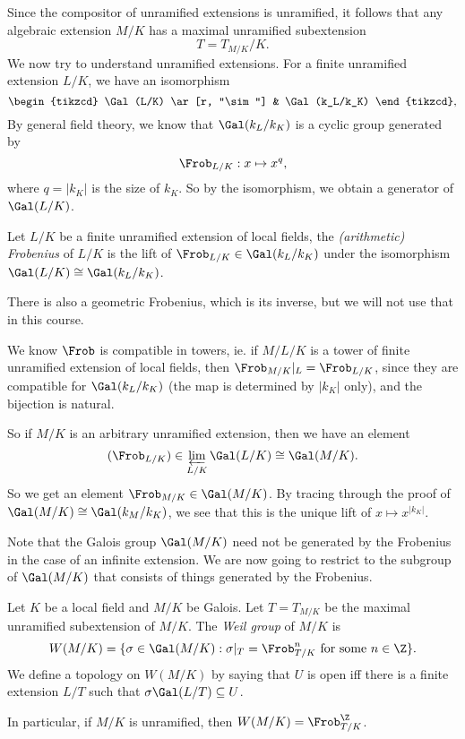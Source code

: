 \documentclass[a4paper]{article}
\begin{document}
Since the compositor of unramified extensions is unramified, it follows that any algebraic extension $M/K$ has a maximal unramified subextension
\[
  T = T_{M/K}/K.
\]
We now try to understand unramified extensions. For a finite unramified extension $L/K$, we have an isomorphism
\[
  \begin{tikzcd}
    \Gal(L/K) \ar[r, "\sim"] & \Gal(k_L/k_K)
  \end{tikzcd},
\]
By general field theory, we know that $\Gal(k_L/k_K)$ is a cyclic group generated by
\[
  \Frob_{L/K}: x \mapsto x^q,
\]
where $q = |k_K|$ is the size of $k_K$. So by the isomorphism, we obtain a generator of $\Gal(L/K)$.

\begin{defi}
  Let $L/K$ be a finite unramified extension of local fields, the \emph{(arithmetic) Frobenius} of $L/K$ is the lift of $\Frob_{L/K} \in \Gal(k_L/k_K)$ under the isomorphism $\Gal(L/K) \cong \Gal(k_L/k_K)$.
\end{defi}
There is also a geometric Frobenius, which is its inverse, but we will not use that in this course.

We know $\Frob$ is compatible in towers, ie. if $M/L/K$ is a tower of finite unramified extension of local fields, then $\Frob_{M/K}|_L = \Frob_{L/K}$, since they are compatible for $\Gal(k_L/k_K)$ (the map is determined by $|k_K|$ only), and the bijection is natural.

So if $M/K$ is an arbitrary unramified extension, then we have an element
\[
  (\Frob_{L/K}) \in \varprojlim_{L/K} \Gal(L/K) \cong \Gal(M/K).
\]
So we get an element $\Frob_{M/K} \in \Gal(M/K)$. By tracing through the proof of $\Gal(M/K) \cong \Gal(k_M/k_K)$, we see that this is the unique lift of $x \mapsto x^{|k_K|}$.

Note that the Galois group $\Gal(M/K)$ need not be generated by the Frobenius in the case of an infinite extension. We are now going to restrict to the subgroup of $\Gal(M/K)$ that consists of things generated by the Frobenius.

\begin{defi}
  Let $K$ be a local field and $M/K$ be Galois. Let $T = T_{M/K}$ be the maximal unramified subextension of $M/K$. The \emph{Weil group} of $M/K$ is
  \[
    W(M/K) = \{\sigma \in \Gal(M/K): \sigma|_T = \Frob_{T/K}^n\text{ for some }n \in \Z\}.
  \]
  We define a topology on $W(M/K)$ by saying that $U$ is open iff there is a finite extension $L/T$ such that $\sigma \Gal(L/T) \subseteq U$.
\end{defi}
In particular, if $M/K$ is unramified, then $W(M/K) = \Frob_{T/K}^\Z$.
\end{document}

